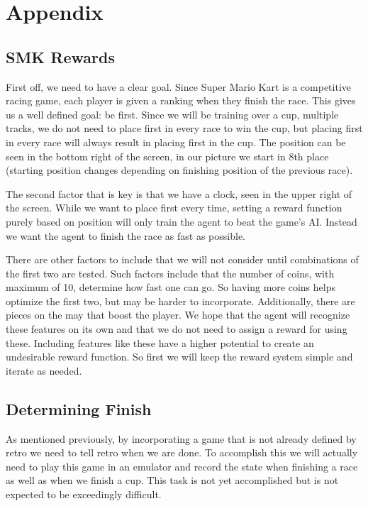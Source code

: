 \section{Appendix}
\subsection{SMK Rewards}
\label{sec:SMKRewards}
First off, we need to have a clear goal. Since Super Mario Kart is a competitive
racing game, each player is given a ranking when they finish the race. This
gives us a well defined goal: be first. Since we will be training over a cup,
multiple tracks, we do not need to place first in every race to win the cup, but
placing first in every race will always result in placing first in the cup. The
position can be seen in the bottom right of the screen, in our picture we start
in 8th place (starting position changes depending on finishing position of the 
previous race).

The second factor that is key is that we have a clock, seen in the upper right
of the screen. While we want to place first every time, setting a reward function
purely based on position will only train the agent to beat the game's AI. Instead
we want the agent to finish the race as fast as possible. 

There are other factors to include that we will not consider until combinations 
of the first two are tested. Such factors include that the number of coins, 
with maximum of 10, determine how fast one can go. So having more coins helps
optimize the first two, but may be harder to incorporate. Additionally, there
are pieces on the may that boost the player. We hope that the agent will 
recognize these features on its own and that we do not need to assign a reward
for using these. Including features like these have a higher potential to create
an undesirable reward function. So first we will keep the reward system simple 
and iterate as needed.

\subsection{Determining Finish}
\label{sec:endstate}
As mentioned previously, by incorporating a game that is not already defined by
retro we need to tell retro when we are done. To accomplish this we will actually
need to play this game in an emulator and record the state when finishing a race
as well as when we finish a cup. This task is not yet accomplished but is not 
expected to be exceedingly difficult. 

